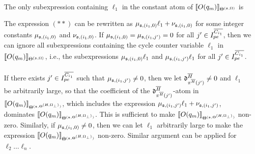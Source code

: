 The only subexpression containing $\ell_1$ in the constant atom of  $\llbracket O(q_m)\rrbracket_{\Theta^{({\mathfrak{s} },\Omega)}}$ is
\begin{center}
\end{center}
%
The expression $(\ast\ast)$ can be rewritten as $\mu_{{\mathfrak{s} },(i_1,0)} \ell_1 + \nu_{{\mathfrak{s} },(i_1,0)}$ for some integer constants $\mu_{{\mathfrak{s} }, (i_1,0)}$ and $\nu_{{\mathfrak{s} }, (i_1,0)}$. If $\mu_{{\mathfrak{s} },(i_1,0)}=\mu_{{\mathfrak{s} },(i_1,j')}=0$ for all $j' \in I^{\overline{C_{i_1}}}_{pe}$, then we can ignore all subexpressions containing the cycle counter variable $\ell_1$ in   $\llbracket O(q_m)\rrbracket_{\Theta^{({\mathfrak{s} },\Omega)}}$, i.e., the subexpressions $\mu_{{\mathfrak{s} },(i_1,0)}\ell_1$ and $\mu_{{\mathfrak{s} },(i_1,j')}\ell_1$ for all $j' \in I^{\overline{C_{i_1}}}_{pe}$.\smallskip\\
\smallskip\\
If there exists $j' \in I^{\overline{C_{i_1}}}_{pe}$ such that $\mu_{{\mathfrak{s} },(i_1,j')} \neq 0$, then we let $\mathfrak{d}^{\overline{H}}_{\pi^{\overline{H}}(j')} \neq 0$ and $\ell_1$ be arbitrarily large, so that the coefficient of the  $\mathfrak{d}^{\overline{H}}_{\pi^{\overline{H}}(j')}$-atom in $\llbracket O(q_m)\rrbracket_{\Theta^{({\mathfrak{s} },\Theta^{(H,\Omega_\bot)})}}$, which includes the expression $\mu_{{\mathfrak{s} }, (i_1,j')} \ell_1 + \nu_{{\mathfrak{s} }, (i_1,j')}$, dominates $\llbracket O(q_m)\rrbracket_{\Theta^{({\mathfrak{s} },\Theta^{(H,\Omega_\bot)})}}$. This is sufficient to make $\llbracket O(q_m)\rrbracket_{\Theta^{({\mathfrak{s} },\Theta^{(H,\Omega_\bot)})}}$ non-zero. Similarly, if $\mu_{{\mathfrak{s} },(i_1,0)} \neq 0$, then we can let $\ell_1$ arbitrarily large to make the expression $\llbracket O(q_m)\rrbracket_{\Theta^{({\mathfrak{s} },\Theta^{(H,\Omega_\bot)})}}$ non-zero.
Similar argument can be applied for $\ell_2\dots\ell_n$.

